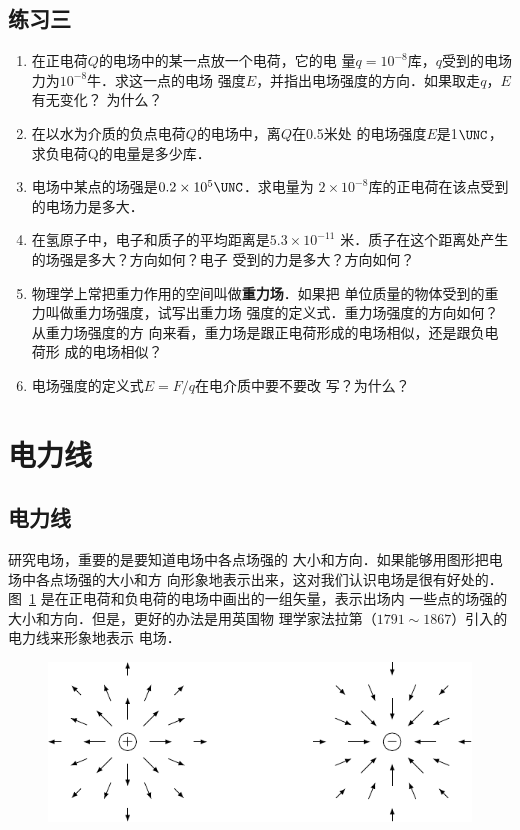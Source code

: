 \subsection*{练习三}

\begin{enumerate}
    \item 在正电荷$Q$的电场中的某一点放一个电荷，它的电
    量$q=10^{-8}$库，$q$受到的电场力为$10^{-8}$牛．求这一点的电场
    强度$E$，并指出电场强度的方向．如果取走$q$，$E$有无变化？
    为什么？
    \item 在以水为介质的负点电荷$Q$的电场中，离$Q$在0.5米处
    的电场强度$E$是1$\UNC$，求负电荷Q的电量是多少库．
    \item 电场中某点的场强是$0.2\times10^5\UNC$．求电量为
    $2\times10^{-8}$库的正电荷在该点受到的电场力是多大．
    \item 在氢原子中，电子和质子的平均距离是$5.3\times10^{-11}$
    米．质子在这个距离处产生的场强是多大？方向如何？电子
    受到的力是多大？方向如何？
    \item 物理学上常把重力作用的空间叫做\textbf{重力场}．如果把
    单位质量的物体受到的重力叫做重力场强度，试写出重力场
    强度的定义式．重力场强度的方向如何？从重力场强度的方
    向来看，重力场是跟正电荷形成的电场相似，还是跟负电荷形
成的电场相似？
\item 电场强度的定义式$E=F/q$在电介质中要不要改
写？为什么？
\end{enumerate}


\section{电力线}
\subsection{电力线}

研究电场，重要的是要知道电场中各点场强的
大小和方向．如果能够用图形把电场中各点场强的大小和方
向形象地表示出来，这对我们认识电场是很有好处的．图~\ref{fig_B_6-6} 
是在正电荷和负电荷的电场中画出的一组矢量，表示出场内
一些点的场强的大小和方向．但是，更好的办法是用英国物
理学家法拉第（$1791 \sim 1867$）引入的电力线来形象地表示
电场．
\begin{figure}[htbp]
    \centering
    \includegraphics{fig/B/6-6.pdf}
    \caption{}\label{fig_B_6-6}
\end{figure}

